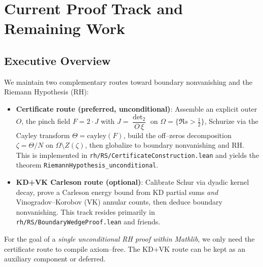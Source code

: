 \section{Current Proof Track and Remaining Work}

\subsection{Executive Overview}
We maintain two complementary routes toward boundary nonvanishing and the Riemann Hypothesis (RH):
\begin{itemize}
  \item \textbf{Certificate route (preferred, unconditional)}: Assemble an explicit outer $O$, the pinch field $F=2\cdot J$ with $J = \dfrac{\operatorname{det}_2}{O\,\xi}$ on $\Omega = \{\Re s > \tfrac12\}$, Schurize via the Cayley transform $\Theta = \mathrm{cayley}(F)$, build the off--zeros decomposition $\zeta=\Theta/N$ on $\Omega\setminus Z(\zeta)$, then globalize to boundary nonvanishing and RH. This is implemented in
  \texttt{rh/RS/CertificateConstruction.lean} and yields the theorem \texttt{RiemannHypothesis\_unconditional}.
  \item \textbf{KD+VK Carleson route (optional)}: Calibrate Schur via dyadic kernel decay, prove a Carleson energy bound from KD partial sums \emph{and} Vinogradov--Korobov (VK) annular counts, then deduce boundary nonvanishing. This track resides primarily in \texttt{rh/RS/BoundaryWedgeProof.lean} and friends.
\end{itemize}

For the goal of a \emph{single unconditional RH proof within Mathlib}, we only need the certificate route to compile axiom--free. The KD+VK route can be kept as an auxiliary component or deferred.

